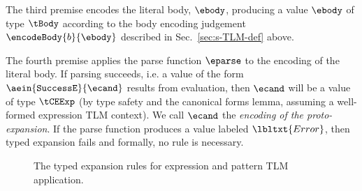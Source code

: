 \documentclass[acmsmall]{acmart}
\begin{document}
The third premise encodes the literal body, $\ebody$, producing a value $\ebody$ of type $\tBody$ according to the body encoding judgement $\encodeBody{b}{\ebody}$ described in Sec.~\ref{sec:s-TLM-def} above.

The fourth premise applies the parse function $\eparse$ to the encoding of the literal body. If parsing succeeds, i.e. a value of the form $\aein{\mathtt{SuccessE}}{\ecand}$ results from evaluation, then $\ecand$ will be a value of type $\tCEExp$ (by type safety and the canonical forms lemma, assuming a well-formed expression TLM context). We call $\ecand$ the \emph{encoding of the proto-expansion}. If the parse function produces a value labeled $\lbltxt{Error}$, then typed expansion fails and formally, no rule is necessary.



\begin{figure*}
{\small\begin{mathpar}
\end{mathpar}}
{\small\begin{mathpar}
\end{mathpar}}
\caption{The typed expansion rules for expression and pattern TLM application.}
\label{fig:ee-ap-setlm}
\end{figure*}
\end{document}
